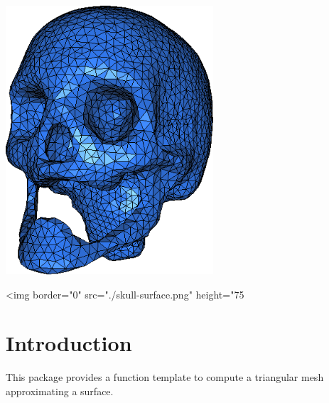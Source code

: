 


\minitoc


\begin{center}
 \begin{ccTexOnly}
   \includegraphics[height=10cm]{Surface_mesher/skull-surface}
 \end{ccTexOnly}
 \begin{ccHtmlOnly}
   <img border="0" src="./skull-surface.png" height="75%
 \end{ccHtmlOnly}
\end{center}

\section{Introduction\label{SurfaceMesher_section_intro}}

This package provides a function template
to compute a triangular mesh approximating a surface.

